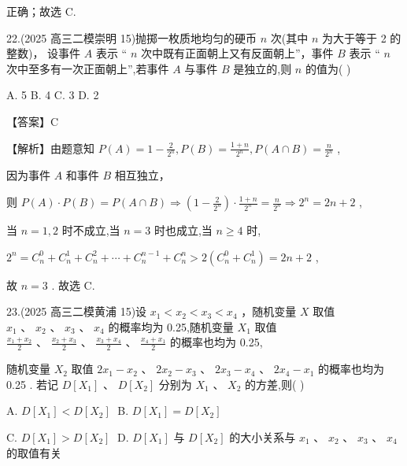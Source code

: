 \documentclass[10pt]{article}
\newcommand*\circled[1]{\tikz[baseline=(char.base)]{\node[shape=circle,draw,inner sep=1.5pt] (char) {\small #1};}}
\begin{document}
 \circled{2} 正确；故选 C.

22.(2025 高三二模崇明 15)抛掷一枚质地均匀的硬币 \(n\) 次(其中 \(n\) 为大于等于 2 的整数)， 设事件 \(A\) 表示 “ \(n\) 次中既有正面朝上又有反面朝上”，事件 \(B\) 表示 “ \(n\) 次中至多有一次正面朝上”,若事件 \(A\) 与事件 \(B\) 是独立的,则 \(n\) 的值为( )

A. 5 B. 4 C. 3 D. 2

【答案】C

【解析】由题意知 \(P\left( A\right)  = 1 - \frac{2}{{2}^{n}},P\left( B\right)  = \frac{1 + n}{{2}^{n}},P\left( {A \cap  B}\right)  = \frac{n}{{2}^{n}}\) ,

因为事件 \(A\) 和事件 \(B\) 相互独立，

则 \(P\left( A\right)  \cdot  P\left( B\right)  = P\left( {A \cap  B}\right)  \Rightarrow  \left( {1 - \frac{2}{{2}^{n}}}\right)  \cdot  \frac{1 + n}{{2}^{n}} = \frac{n}{{2}^{n}} \Rightarrow  {2}^{n} = {2n} + 2\) ,

当 \(n = 1,2\) 时不成立,当 \(n = 3\) 时也成立,当 \(n \geq  4\) 时,

\({2}^{n} = {C}_{n}^{0} + {C}_{n}^{1} + {C}_{n}^{2} + \cdots  + {C}_{n}^{n - 1} + {C}_{n}^{n} > 2\left( {{C}_{n}^{0} + {C}_{n}^{1}}\right)  = {2n} + 2\) ,

故 \(n = 3\) . 故选 C.

23.(2025 高三二模黄浦 15)设 \({x}_{1} < {x}_{2} < {x}_{3} < {x}_{4}\) ，随机变量 \(X\) 取值 \({x}_{1}\text{ 、 }{x}_{2}\text{ 、 }{x}_{3}\text{ 、 }{x}_{4}\) 的概率均为 0.25,随机变量 \({X}_{1}\) 取值 \(\frac{{x}_{1} + {x}_{2}}{2}\text{ 、 }\frac{{x}_{2} + {x}_{3}}{2}\text{ 、 }\frac{{x}_{3} + {x}_{4}}{2}\text{ 、 }\frac{{x}_{4} + {x}_{1}}{2}\) 的概率也均为 0.25,

随机变量 \({X}_{2}\) 取值 \(2{x}_{1} - {x}_{2}\text{ 、 }2{x}_{2} - {x}_{3}\text{ 、 }2{x}_{3} - {x}_{4}\text{ 、 }2{x}_{4} - {x}_{1}\) 的概率也均为 0.25 . 若记 \(D\left\lbrack  {X}_{1}\right\rbrack\) 、 \(D\left\lbrack  {X}_{2}\right\rbrack\) 分别为 \({X}_{1}\text{ 、 }{X}_{2}\) 的方差,则( )

A. \(D\left\lbrack  {X}_{1}\right\rbrack   < D\left\lbrack  {X}_{2}\right\rbrack  \;\) B. \(D\left\lbrack  {X}_{1}\right\rbrack   = D\left\lbrack  {X}_{2}\right\rbrack\)

C. \(D\left\lbrack  {X}_{1}\right\rbrack   > D\left\lbrack  {X}_{2}\right\rbrack  \;\) D. \(D\left\lbrack  {X}_{1}\right\rbrack\) 与 \(D\left\lbrack  {X}_{2}\right\rbrack\) 的大小关系与 \({x}_{1}\text{ 、 }{x}_{2}\text{ 、 }{x}_{3}\text{ 、 }{x}_{4}\) 的取值有关
\end{document}
